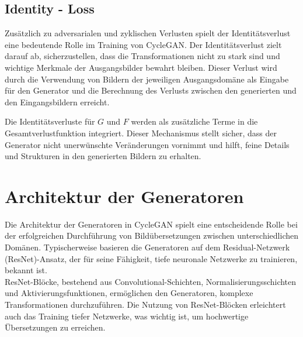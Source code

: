 \subsection*{Identity - Loss}
Zusätzlich zu adversarialen und zyklischen Verlusten spielt der Identitätsverlust eine bedeutende Rolle im Training von CycleGAN. Der Identitätsverlust zielt darauf ab, sicherzustellen, dass die Transformationen nicht zu stark sind und wichtige Merkmale der Ausgangsbilder bewahrt bleiben. Dieser Verlust wird durch die Verwendung von Bildern der jeweiligen Ausgangsdomäne als Eingabe für den Generator und die Berechnung des Verlusts zwischen den generierten und den Eingangsbildern erreicht.

Die Identitätsverluste für $G$ und $F$ werden als zusätzliche Terme in die Gesamtverlustfunktion integriert. Dieser Mechanismus stellt sicher, dass der Generator nicht unerwünschte Veränderungen vornimmt und hilft, feine Details und Strukturen in den generierten Bildern zu erhalten.

\section*{Architektur der Generatoren}
Die Architektur der Generatoren in CycleGAN spielt eine entscheidende Rolle bei der erfolgreichen Durchführung von Bildübersetzungen zwischen unterschiedlichen Domänen. Typischerweise basieren die Generatoren auf dem Residual-Netzwerk (ResNet)-Ansatz, der für seine Fähigkeit, tiefe neuronale Netzwerke zu trainieren, bekannt ist.
\\
ResNet-Blöcke, bestehend aus Convolutional-Schichten, Normalisierungsschichten und Aktivierungsfunktionen, ermöglichen den Generatoren, komplexe Transformationen durchzuführen. Die Nutzung von ResNet-Blöcken erleichtert auch das Training tiefer Netzwerke, was wichtig ist, um hochwertige Übersetzungen zu erreichen.

